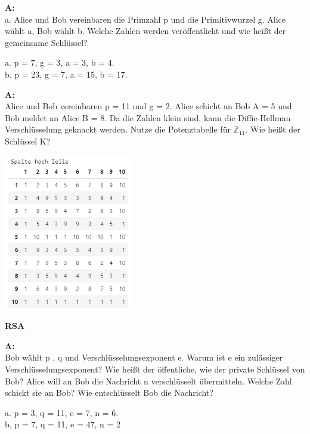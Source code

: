 \documentclass[landscape,twocolumn,a4paper]{article}
\begin{document}
\textbf{A:}   \\
a. Alice und Bob vereinbaren die Primzahl p und die Primitivwurzel g.
Alice wählt a, Bob wählt b. Welche Zahlen werden veröffentlicht und wie heißt der gemeinsame Schlüssel?

a.  p = 7, g = 3, a = 3, b = 4.  \\
b.  p = 23, g = 7, a = 15, b = 17.

\bigskip {}

\textbf{A:}   \\
Alice und Bob vereinbaren p = 11 und g = 2. Alice schicht an Bob A = 5 und Bob meldet an Alice B = 8. Da die Zahlen klein sind, kann die Diffie-Hellman Verschlüsselung geknackt werden. Nutze die Potenztabelle für $\mathbb{Z}_{11}$. Wie heißt der Schlüssel K?

\includegraphics[height=6.8cm]{bild1.png}
\bigskip {}

\textbf{RSA} \bigskip

\textbf{A:}   \\
Bob wählt p , q  und Verschlüsselungsexponent e. Warum ist e ein
zulässiger Verschlüsselungsexponent? Wie heißt der öffentliche, wie der private Schlüssel von Bob?
Alice will an Bob die Nachricht n verschlüsselt übermitteln.  
Welche Zahl schickt sie an Bob? Wie entschlüsselt Bob die Nachricht?

a.  p = 3, q = 11,  e = 7, n = 6. \\
b.  p = 7, q = 11, e = 47, n = 2 


\bigskip {}
\bigskip {}
\end{document}
